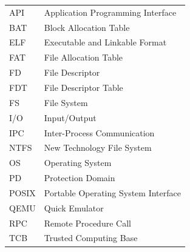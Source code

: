 \begin{tabular}{ll}
  API  & Application Programming Interface \\
  BAT  & Block Allocation Table \\
  ELF  & Executable and Linkable Format \\
  FAT  & File Allocation Table \\
  FD   & File Descriptor \\
  FDT  & File Descriptor Table \\
  FS   & File System \\
  I/O  & Input/Output \\
  IPC  & Inter-Process Communication \\
  NTFS & New Technology File System \\
  OS   & Operating System \\
  PD   & Protection Domain \\
  POSIX & Portable Operating System Interface \\
  QEMU & Quick Emulator \\
  RPC  & Remote Procedure Call \\
  TCB  & Trusted Computing Base \\
\end{tabular}